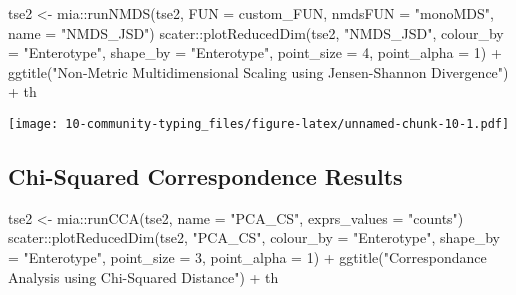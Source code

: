 \documentclass[
  oneside]{book}
\newenvironment{Shaded}{\begin{snugshade}}{\end{snugshade}}
\newcommand{\AttributeTok}[1]{\textcolor[rgb]{0.77,0.63,0.00}{#1}}
\newcommand{\DecValTok}[1]{\textcolor[rgb]{0.00,0.00,0.81}{#1}}
\newcommand{\FunctionTok}[1]{\textcolor[rgb]{0.00,0.00,0.00}{#1}}
\newcommand{\NormalTok}[1]{#1}
\newcommand{\OtherTok}[1]{\textcolor[rgb]{0.56,0.35,0.01}{#1}}
\newcommand{\SpecialCharTok}[1]{\textcolor[rgb]{0.00,0.00,0.00}{#1}}
\newcommand{\StringTok}[1]{\textcolor[rgb]{0.31,0.60,0.02}{#1}}
\begin{document}
\begin{Shaded}
\begin{Highlighting}[]
\NormalTok{tse2 }\OtherTok{\textless{}{-}}\NormalTok{ mia}\SpecialCharTok{::}\FunctionTok{runNMDS}\NormalTok{(tse2, }\AttributeTok{FUN =}\NormalTok{ custom\_FUN, }\AttributeTok{nmdsFUN =} \StringTok{"monoMDS"}\NormalTok{, }\AttributeTok{name =} \StringTok{"NMDS\_JSD"}\NormalTok{)}
\NormalTok{scater}\SpecialCharTok{::}\FunctionTok{plotReducedDim}\NormalTok{(tse2, }\StringTok{"NMDS\_JSD"}\NormalTok{, }\AttributeTok{colour\_by =} \StringTok{"Enterotype"}\NormalTok{, }
                       \AttributeTok{shape\_by =} \StringTok{"Enterotype"}\NormalTok{, }\AttributeTok{point\_size =} \DecValTok{4}\NormalTok{, }\AttributeTok{point\_alpha =} \DecValTok{1}\NormalTok{) }\SpecialCharTok{+} 
                       \FunctionTok{ggtitle}\NormalTok{(}\StringTok{"Non{-}Metric Multidimensional Scaling using Jensen{-}Shannon Divergence"}\NormalTok{) }\SpecialCharTok{+}\NormalTok{ th}
\end{Highlighting}
\end{Shaded}

\texttt{[image: 10-community-typing\_files/figure-latex/unnamed-chunk-10-1.pdf]}

\hypertarget{chi-squared-correspondence-results}{%
\subsection{Chi-Squared Correspondence Results}\label{chi-squared-correspondence-results}}

\begin{Shaded}
\begin{Highlighting}[]
\NormalTok{tse2 }\OtherTok{\textless{}{-}}\NormalTok{ mia}\SpecialCharTok{::}\FunctionTok{runCCA}\NormalTok{(tse2, }\AttributeTok{name =} \StringTok{"PCA\_CS"}\NormalTok{, }\AttributeTok{exprs\_values =} \StringTok{"counts"}\NormalTok{)}
\NormalTok{scater}\SpecialCharTok{::}\FunctionTok{plotReducedDim}\NormalTok{(tse2, }\StringTok{"PCA\_CS"}\NormalTok{, }\AttributeTok{colour\_by =} \StringTok{"Enterotype"}\NormalTok{, }
                       \AttributeTok{shape\_by =} \StringTok{"Enterotype"}\NormalTok{, }\AttributeTok{point\_size =} \DecValTok{3}\NormalTok{, }\AttributeTok{point\_alpha =} \DecValTok{1}\NormalTok{) }\SpecialCharTok{+}
                       \FunctionTok{ggtitle}\NormalTok{(}\StringTok{"Correspondance Analysis using Chi{-}Squared Distance"}\NormalTok{) }\SpecialCharTok{+}\NormalTok{ th}
\end{Highlighting}
\end{Shaded}
\end{document}
